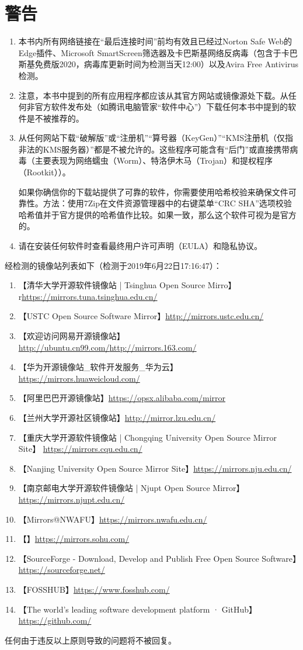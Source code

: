 \chapter{警告}
\begin{enumerate}
\item 本书内所有网络链接在“最后连接时间”前均有效且已经过Norton Safe Web的Edge插件、Microsoft SmartScreen筛选器及卡巴斯基网络反病毒（包含于卡巴斯基免费版2020，病毒库更新时间为检测当天12:00）以及Avira Free Antivirus检测。 
\item 注意，本书中提到的所有应用程序都应该从其官方网站或镜像源处下载。从任何非官方软件发布处（如腾讯电脑管家“软件中心”）下载任何本书中提到的软件是不被推荐的。\par 
\item 从任何网站下载“破解版”或“注册机”“算号器（KeyGen）”“KMS注册机（仅指非法的KMS服务器）”都是不被允许的。这些程序可能含有“后门”或直接携带病毒（主要表现为网络蠕虫（Worm）、特洛伊木马（Trojan）和提权程序（Rootkit））\cite{HR1}\cite{HR2}\cite{HR3}\cite{HR4}\cite{HR5}。\par
如果你确信你的下载站提供了可靠的软件，你需要使用哈希校验来确保文件可靠性。方法：使用7Zip在文件资源管理器中的右键菜单“CRC SHA”选项校验哈希值并于官方提供的哈希值作比较。如果一致，那么这个软件可视为是官方的。
\item 请在安装任何软件时查看最终用户许可声明（EULA）和隐私协议。
\end{enumerate}
经检测的镜像站列表如下（检测于2019年6月22日17:16:47）：
\begin{enumerate}
	\item 【清华大学开源软件镜像站 | Tsinghua Open Source Mirro】r\url{https://mirrors.tuna.tsinghua.edu.cn/}
	\item 【USTC Open Source Software Mirror】\url{http://mirrors.ustc.edu.cn/}
	\item 【欢迎访问网易开源镜像站】\url{http://ubuntu.cn99.com/}\url{http://mirrors.163.com/}
	\item 【华为开源镜像站\_软件开发服务\_华为云】\url{https://mirrors.huaweicloud.com/}
	\item 【阿里巴巴开源镜像站】\url{https://opsx.alibaba.com/mirror}
	\item 【兰州大学开源社区镜像站】\url{http://mirror.lzu.edu.cn/}
	\item 【重庆大学开源软件镜像站 | Chongqing University Open Source Mirror Site】 \url{https://mirrors.cqu.edu.cn/}
	\item 【Nanjing University Open Source Mirror Site】\url{https://mirrors.nju.edu.cn/}
	\item 【南京邮电大学开源软件镜像站 | Njupt Open Source Mirror】\url{https://mirrors.njupt.edu.cn/}
	\item 【Mirrors@NWAFU】\url{https://mirrors.nwafu.edu.cn/}
	\item 【】\url{https://mirrors.sohu.com/}
	\item 【SourceForge - Download, Develop and Publish Free Open Source Software】\url{https://sourceforge.net/}
	\item 【FOSSHUB】\url{https://www.fosshub.com/}
	\item 【The world’s leading software development platform · GitHub】\url{https://github.com/}
\end{enumerate}
任何由于违反以上原则导致的问题将不被回复。
